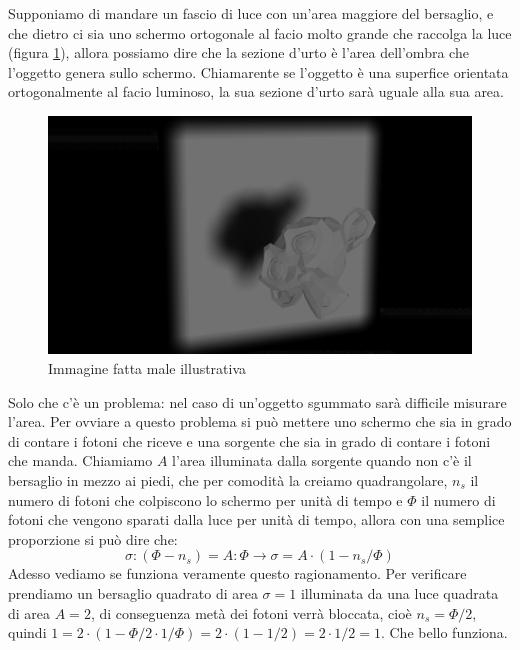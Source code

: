 \documentclass[11pt,a4paper]{report}
\begin{document}
		Supponiamo di mandare un fascio di luce con un'area maggiore del bersaglio, e che dietro ci sia uno schermo ortogonale al facio molto grande che raccolga la luce (figura \ref{fig:ombra}), allora possiamo dire che la sezione d'urto è l'area dell'ombra che l'oggetto genera sullo schermo.\newline
		Chiamarente se l'oggetto è una superfice orientata ortogonalmente al facio luminoso, la sua sezione d'urto sarà uguale alla sua area.\newline
		\begin{figure}
			\centering
    		\includegraphics[width=\linewidth]{Immagini/ombra_con_blender.png}
    		\caption{Immagine fatta male illustrativa}
    		\label{fig:ombra}
		\end{figure}

		Solo che c'è un problema: nel caso di un'oggetto sgummato sarà difficile misurare l'area. Per ovviare a questo problema si può mettere uno schermo che sia in grado di contare i fotoni che riceve e una sorgente che sia in grado di contare i fotoni che manda.\newline
		Chiamiamo $A$ l'area illuminata dalla sorgente quando non c'è il bersaglio in mezzo ai piedi, che per comodità la creiamo quadrangolare, $n_s$ il numero di fotoni che colpiscono lo schermo per unità di tempo e $\Phi$ il numero di fotoni che vengono sparati dalla luce per unità di tempo, allora con una semplice proporzione si può dire che:
		\begin{equation}
			\sigma:(\Phi-n_s)=A:\Phi \rightarrow \sigma=A\cdot(1-n_s/\Phi)
			\label{eq:sigma_luce}
		\end{equation}
		Adesso vediamo se funziona veramente questo ragionamento.\newline
		Per verificare prendiamo un bersaglio quadrato di area $\sigma=1$ illuminata da una luce quadrata di area $A=2$, di conseguenza metà dei fotoni verrà bloccata, cioè $n_s=\Phi/2$, quindi $1=2\cdot(1-\Phi/2\cdot 1/\Phi)=2\cdot(1-1/2)=2\cdot 1/2=1$.\newline
		Che bello funziona.\newline
\end{document}
